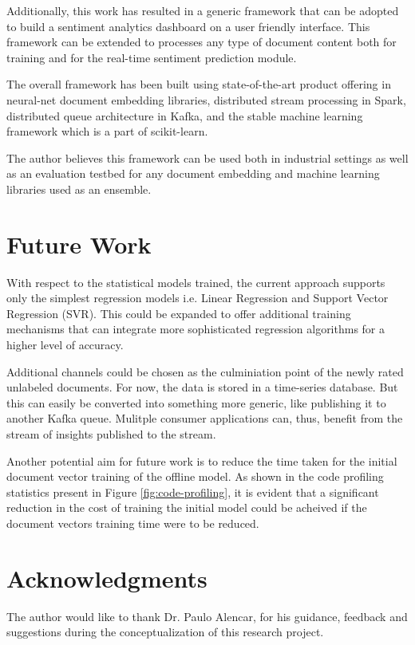 \documentclass[conference]{IEEEtran}
\begin{document}
Additionally, this work has resulted in a generic framework that can be adopted to build a sentiment analytics dashboard on a user friendly interface. 
This framework can be extended to processes any type of document content both for training and for the real-time sentiment prediction module.

The overall framework has been built using state-of-the-art product offering in neural-net document embedding libraries, distributed stream processing in Spark, distributed queue architecture in Kafka, and the stable machine learning framework which is a part of scikit-learn. 

The author believes this framework can be used both in industrial settings as well as an evaluation testbed for any document embedding and machine learning libraries used as an ensemble.

\vspace{5mm}

\section{Future Work}
With respect to the statistical models trained, the current approach supports only the simplest regression models i.e. Linear Regression and Support Vector Regression (SVR). 
This could be expanded to offer additional training mechanisms that can integrate more sophisticated regression algorithms for a higher level of accuracy.
 
Additional channels could be chosen as the culminiation point of the newly rated unlabeled documents.
For now, the data is stored in a time-series database.
But this can easily be converted into something more generic, like publishing it to another Kafka queue.
Mulitple consumer applications can, thus, benefit from the stream of insights published to the stream.

Another potential aim for future work is to reduce the time taken for the initial document vector training of the offline model.
As shown in the code profiling statistics present in Figure \ref{fig:code-profiling}, it is evident that a significant reduction in the cost of training the initial model could be acheived if the document vectors training time were to be reduced.

\vspace{5mm}

\section{Acknowledgments}
The author would like to thank Dr. Paulo Alencar, for his guidance, feedback and suggestions during the conceptualization of this research project.

\vspace{5mm}



\end{document}
